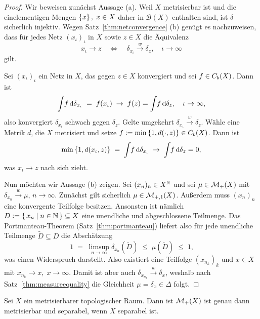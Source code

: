 \documentclass[../main/main.tex]{subfiles}
\begin{document}
	\begin{proof}
		Wir beweisen zunächst Aussage (a). Weil $X$ metrisierbar ist und die einelementigen Mengen $\left\{x\right\}, \; x \in X$ daher in $\mathcal{B}(X)$ enthalten sind, ist $\delta$ sicherlich injektiv.
		Wegen Satz~\ref{thm:netconvergence} (b) genügt es nachzuweisen, dass für jedes Netz $(x_\iota)_\iota$ in $X$ sowie $z \in X$ die Äquivalenz
		\[ x_\iota \to z \quad \iff \quad \delta_{x_\iota} \xrightarrow{w} \delta_z, \quad \iota \to \infty \]
		gilt. 
		
		Sei  $(x_\iota)_\iota$ ein Netz in $X$, das gegen $z \in X$ konvergiert und sei $f \in C_b(X)$. Dann ist
		\[ \int_{} \, f \, \mathrm{d}\delta_{x_\iota} \; = \; f(x_\iota) \; \to \; f(z) = \int_{} \, f \, \mathrm{d}\delta_{z}, \quad \iota \to \infty \text{,} \]
		also konvergiert $\delta_{x_\iota}$ schwach gegen $\delta_z$. Gelte umgekehrt $\delta_{x_\iota} \xrightarrow{w} \delta_z$. Wähle eine Metrik $d$, die $X$ metrisiert und
		setze $f \vcentcolon = \min \left\{1, d(\cdot, z)\right\} \in C_b(X)$. Dann ist 
		\[ \min \left\{1, d(x_\iota, z)\right\} \; = \; \int_{} \, f \, \mathrm{d}\delta_{x_\iota} \; \to \; \int_{} \, f \, \mathrm{d}\delta_{z} = 0 \text{,} \]
		was $x_\iota \to z$ nach sich zieht.
		
		Nun möchten wir Aussage (b) zeigen. Sei $(x_n)_n \in X^{\mathbb{N}}$ und sei $\mu \in \mathcal{M}_{+}(X)$ mit $\delta_{x_n} \xrightarrow{w} \mu$, $n \to \infty$. Zunächst gilt sicherlich $\mu \in \mathcal{M}_{+,1}(X)$.
		Außerdem muss $(x_n)_n$ eine konvergente Teilfolge besitzen. Ansonsten ist nämlich $D \vcentcolon = \left\{\, x_n \; \middle| \; n \in \mathbb{N} \,\right\} \subseteq X$ eine unendliche und abgeschlossene Teilmenge. Das Portmanteau-Theorem (Satz~\ref{thm:portmanteau}) liefert also für jede unendliche Teilmenge $\tilde{D} \subseteq D$ die Abschätzung
		\[ 1 \; = \; \limsup_{n \to \infty} \delta_{x_n}(\tilde{D}) \; \leq \; \mu(\tilde{D}) \; \leq \; 1 \text{,} \]
		was einen Widerspruch darstellt. Also existiert eine Teilfolge $(x_{n_k})_k$ und $x \in X$ mit $x_{n_k} \to x, \; x \to \infty$. Damit ist aber auch $\delta_{x_{n_k}} \xrightarrow{w} \delta_x$, weshalb nach
		Satz~\ref{thm:measureequality} die Gleichheit $\mu = \delta_x \in \Delta$ folgt.
	\end{proof}
	
	\begin{Satz}
		\label{thm:finitemeasuresmetrizableseparable}
		Sei $X$ ein metrisierbarer topologischer Raum. Dann ist $\mathcal{M}_{+}(X)$ ist genau dann metrisierbar und separabel, wenn $X$ separabel ist.
	\end{Satz}
\end{document}
